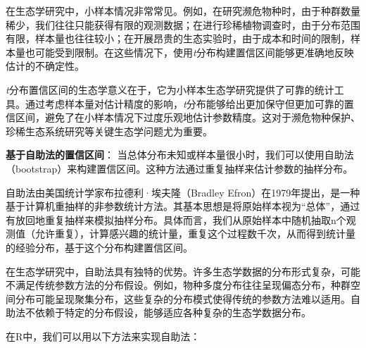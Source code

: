 \documentclass[
  twoside,12pt,fontset=none]{ctexbook}
\newenvironment{Shaded}{\begin{snugshade}}{\end{snugshade}}
\newcommand{\AttributeTok}[1]{\textcolor[rgb]{0.13,0.29,0.53}{#1}}
\newcommand{\CommentTok}[1]{\textcolor[rgb]{0.56,0.35,0.01}{\textit{#1}}}
\newcommand{\ControlFlowTok}[1]{\textcolor[rgb]{0.13,0.29,0.53}{\textbf{#1}}}
\newcommand{\DecValTok}[1]{\textcolor[rgb]{0.00,0.00,0.81}{#1}}
\newcommand{\FloatTok}[1]{\textcolor[rgb]{0.00,0.00,0.81}{#1}}
\newcommand{\FunctionTok}[1]{\textcolor[rgb]{0.13,0.29,0.53}{\textbf{#1}}}
\newcommand{\NormalTok}[1]{#1}
\newcommand{\OtherTok}[1]{\textcolor[rgb]{0.56,0.35,0.01}{#1}}
\newcommand{\SpecialCharTok}[1]{\textcolor[rgb]{0.81,0.36,0.00}{\textbf{#1}}}
\newcommand{\StringTok}[1]{\textcolor[rgb]{0.31,0.60,0.02}{#1}}
\begin{document}
在生态学研究中，小样本情况非常常见。例如，在研究濒危物种时，由于种群数量稀少，我们往往只能获得有限的观测数据；在进行珍稀植物调查时，由于分布范围有限，样本量也往往较小；在开展昂贵的生态实验时，由于成本和时间的限制，样本量也可能受到限制。在这些情况下，使用\emph{t}分布构建置信区间能够更准确地反映估计的不确定性。

\emph{t}分布置信区间的生态学意义在于，它为小样本生态学研究提供了可靠的统计工具。通过考虑样本量对估计精度的影响，\emph{t}分布能够给出更加保守但更加可靠的置信区间，避免了在小样本情况下过度乐观地估计参数精度。这对于濒危物种保护、珍稀生态系统研究等关键生态学问题尤为重要。

\textbf{基于自助法的置信区间}：
当总体分布未知或样本量很小时，我们可以使用自助法（bootstrap）来构建置信区间。这种方法通过重复抽样来估计参数的抽样分布。

自助法由美国统计学家布拉德利·埃夫隆（Bradley Efron）在1979年提出，是一种基于计算机重抽样的非参数统计方法。其基本思想是将原始样本视为``总体''，通过有放回地重复抽样来模拟抽样分布。具体而言，我们从原始样本中随机抽取n个观测值（允许重复），计算感兴趣的统计量，重复这个过程数千次，从而得到统计量的经验分布，基于这个分布构建置信区间。

在生态学研究中，自助法具有独特的优势。许多生态学数据的分布形式复杂，可能不满足传统参数方法的分布假设。例如，物种多度分布往往呈现偏态分布，种群空间分布可能呈现聚集分布，这些复杂的分布模式使得传统的参数方法难以适用。自助法不依赖于特定的分布假设，能够适应各种复杂的生态学数据分布。

在R中，我们可以用以下方法来实现自助法：

\begin{Shaded}
\end{Shaded}
\end{document}
